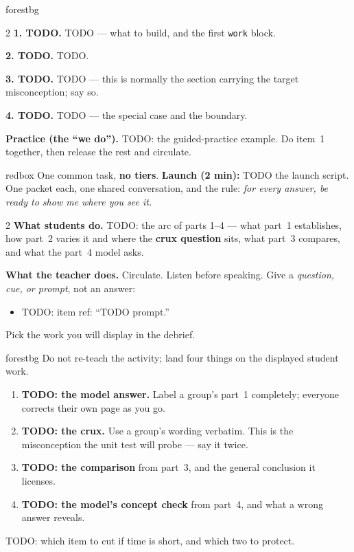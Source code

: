 \documentclass[10pt]{article}
\begin{document}
\begin{skillbox}{forestbg}
\begin{multicols}{2}
\textbf{1. TODO.} TODO --- what to build, and the first \texttt{work} block.

\textbf{2. TODO.} TODO.

\columnbreak
\textbf{3. TODO.} TODO --- this is normally the section carrying the target misconception; say so.

\textbf{4. TODO.} TODO --- the special case and the boundary.

\textbf{Practice (the ``we do'').} TODO: the guided-practice example. Do item~1 together, then
release the rest and circulate.
\end{multicols}
\end{skillbox}

\begin{skillbox}{redbox}
One common task, \textbf{no tiers}. \textbf{Launch (2 min):} TODO the launch script. One packet
each, one shared conversation, and the rule: \emph{for every answer, be ready to show me where you
see it.}
\begin{multicols}{2}
\textbf{What students do.} TODO: the arc of parts 1--4 --- what part~1 establishes, how part~2
varies it and where the \textbf{crux question} sits, what part~3 compares, and what the part~4
model asks.

\columnbreak
\textbf{What the teacher does.} Circulate. Listen before speaking. Give a \emph{question, cue, or
prompt}, not an answer:
\begin{itemize}[leftmargin=1.1em, nosep]
  \item TODO: item ref: ``TODO prompt.''
\end{itemize}
Pick the work you will display in the debrief.
\end{multicols}
\end{skillbox}

\boxguard
\begin{skillbox}{forestbg}
Do not re-teach the activity; land four things on the displayed student work.
\begin{enumerate}[leftmargin=1.3em, nosep, itemsep=2pt]
  \item \textbf{TODO: the model answer.} Label a group's part~1 completely; everyone corrects
        their own page as you go.
  \item \textbf{TODO: the crux.} Use a group's wording verbatim. This is the misconception the
        unit test will probe --- say it twice.
  \item \textbf{TODO: the comparison} from part~3, and the general conclusion it licenses.
  \item \textbf{TODO: the model's concept check} from part~4, and what a wrong answer reveals.
\end{enumerate}
TODO: which item to cut if time is short, and which two to protect.
\end{skillbox}
\end{document}
